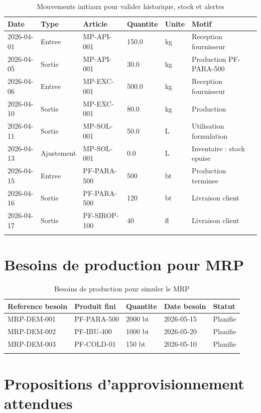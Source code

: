 \documentclass[11pt,a4paper]{article}
\begin{document}
\begin{longtable}{|p{2cm}|p{2.5cm}|p{2.4cm}|p{2cm}|p{2cm}|p{3cm}|}
\hline
\textbf{Date} & \textbf{Type} & \textbf{Article} & \textbf{Quantite} & \textbf{Unite} & \textbf{Motif} \\
\hline
2026-04-01 & Entree & MP-API-001 & 150.0 & kg & Reception fournisseur \\
\hline
2026-04-05 & Sortie & MP-API-001 & 30.0 & kg & Production PF-PARA-500 \\
\hline
2026-04-06 & Entree & MP-EXC-001 & 500.0 & kg & Reception fournisseur \\
\hline
2026-04-10 & Sortie & MP-EXC-001 & 80.0 & kg & Production \\
\hline
2026-04-11 & Sortie & MP-SOL-001 & 50.0 & L & Utilisation formulation \\
\hline
2026-04-13 & Ajustement & MP-SOL-001 & 0.0 & L & Inventaire : stock epuise \\
\hline
2026-04-15 & Entree & PF-PARA-500 & 500 & bt & Production terminee \\
\hline
2026-04-16 & Sortie & PF-PARA-500 & 120 & bt & Livraison client \\
\hline
2026-04-17 & Sortie & PF-SIROP-100 & 40 & fl & Livraison client \\
\hline
\caption{Mouvements initiaux pour valider historique, stock et alertes}
\end{longtable}

\section{Besoins de production pour MRP}

\begin{longtable}{|p{2.8cm}|p{4cm}|p{2cm}|p{2.5cm}|p{3cm}|}
\hline
\textbf{Reference besoin} & \textbf{Produit fini} & \textbf{Quantite} & \textbf{Date besoin} & \textbf{Statut} \\
\hline
MRP-DEM-001 & PF-PARA-500 & 2000 bt & 2026-05-15 & Planifie \\
\hline
MRP-DEM-002 & PF-IBU-400 & 1000 bt & 2026-05-20 & Planifie \\
\hline
MRP-DEM-003 & PF-COLD-01 & 150 bt & 2026-05-10 & Planifie \\
\hline
\caption{Besoins de production pour simuler le MRP}
\end{longtable}

\section{Propositions d'approvisionnement attendues}
\end{document}
